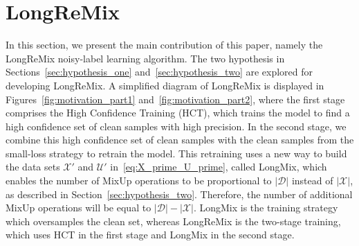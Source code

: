 \documentclass[review]{elsarticle}
\begin{document}
\section{LongReMix}
\label{sec:LongReMix}






















































In this section, we present the main contribution of this paper, namely the LongReMix noisy-label learning algorithm.
The two hypothesis in Sections~\ref{sec:hypothesis_one} and~\ref{sec:hypothesis_two}
are explored for developing LongReMix.
A simplified diagram of LongReMix is displayed in Figures~\ref{fig:motivation_part1} and~\ref{fig:motivation_part2},
where the first stage comprises the High Confidence Training (HCT), which trains the model to find a high confidence set of clean samples with high precision. 
In the second stage, we combine this high confidence set of clean samples with the clean samples from the small-loss strategy to retrain the model. 
This retraining uses a new way to build the data sets $\mathcal{X}'$ and $\mathcal{U}'$ in~\eqref{eq:X_prime_U_prime}, called LongMix,
which enables the number of MixUp operations to be proportional to $|\mathcal{D}|$ instead of  $|\mathcal{X}|$, as described in Section~\ref{sec:hypothesis_two}. Therefore, the number of additional MixUp operations will be equal to $|\mathcal{D}|-|\mathcal{X}|$. 
LongMix is the training strategy which  oversamples the clean set, whereas LongReMix is the two-stage training, which uses HCT in the first stage and LongMix in the second stage.
\end{document}
